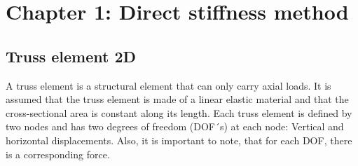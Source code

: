 \documentclass{article}  %
\begin{document}
\newpage
\thispagestyle{empty} %


\newpage
\setcounter{page}{1}

\section{Chapter 1: Direct stiffness method}

\subsection{Truss element 2D}
A truss element is a structural element that can only carry axial loads. It is assumed that the truss element is made of a linear elastic material and that the cross-sectional area is constant along its length. Each truss element is defined by two nodes and has two degrees of freedom (DOF´s) at each node: Vertical and horizontal displacements. Also, it is important to note, that for each DOF, there is a corresponding force. \\
\end{document}
